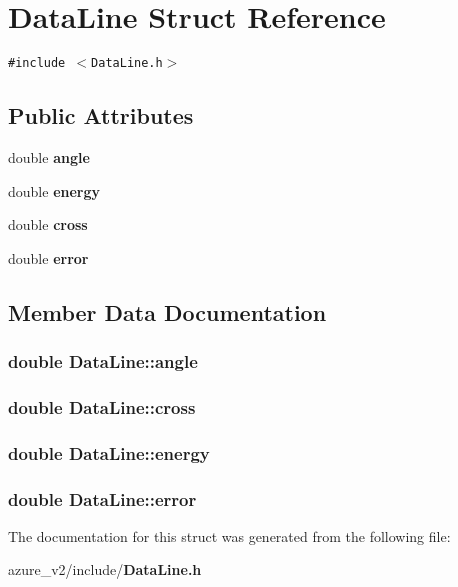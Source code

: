 \section{Data\-Line Struct Reference}
\label{structDataLine}
{\tt \#include $<$Data\-Line.h$>$}

\subsection*{Public Attributes}
\begin{CompactItemize}
\item 
double \bf{angle}
\item 
double \bf{energy}
\item 
double \bf{cross}
\item 
double \bf{error}
\end{CompactItemize}


\subsection{Member Data Documentation}
\subsubsection{\setlength{\rightskip}{0pt plus 5cm}double \bf{Data\-Line::angle}}\label{structDataLine_7106f7c1d89a0032ea94812a16ecb3be}


\subsubsection{\setlength{\rightskip}{0pt plus 5cm}double \bf{Data\-Line::cross}}\label{structDataLine_c3f7d0d16bc583d2ad7a92bb0245bae8}


\subsubsection{\setlength{\rightskip}{0pt plus 5cm}double \bf{Data\-Line::energy}}\label{structDataLine_37cef561b7c4b57f2b1c6922c462f5d0}


\subsubsection{\setlength{\rightskip}{0pt plus 5cm}double \bf{Data\-Line::error}}\label{structDataLine_abae59108188a41d5b8472604984a543}




The documentation for this struct was generated from the following file:\begin{CompactItemize}
\item 
azure\_\-v2/include/\bf{Data\-Line.h}\end{CompactItemize}
